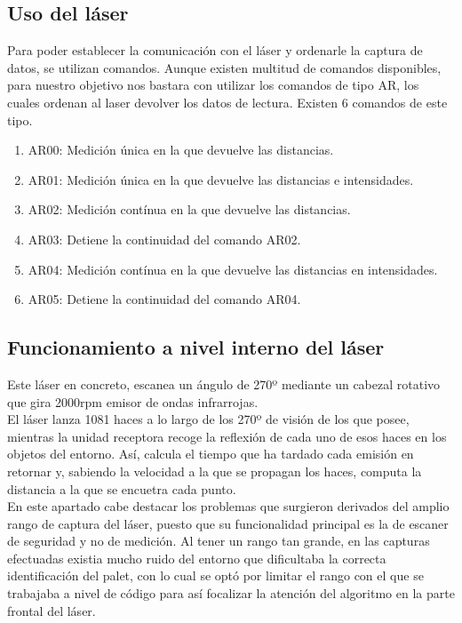 \subsection{Uso del láser}
Para poder establecer la comunicación con el láser y ordenarle la captura de datos, se utilizan comandos. Aunque existen multitud de comandos disponibles, para nuestro objetivo nos bastara con utilizar los comandos de tipo AR, los cuales ordenan al laser devolver los datos de lectura.
Existen 6 comandos de este tipo.
\begin{enumerate}
	\item AR00: Medición única en la que devuelve las distancias.
	\item AR01: Medición única en la que devuelve las distancias e intensidades.
	\item AR02: Medición contínua en la que devuelve las distancias.
	\item AR03: Detiene la continuidad del comando AR02.
	\item AR04: Medición contínua en la que devuelve las distancias en intensidades.
	\item AR05: Detiene la continuidad del comando AR04.
\end{enumerate}

\subsection{Funcionamiento a nivel interno del láser}
				Este láser en concreto, escanea un ángulo de 270º mediante un cabezal rotativo que gira 2000rpm emisor de ondas infrarrojas.\cite{hokuyo:data_specification} 
\\ El láser lanza 1081 haces  a lo largo de los 270º de visión de los que posee, mientras la unidad receptora recoge la reflexión de cada uno de esos haces en los objetos del entorno. Así, calcula el tiempo que ha tardado cada emisión en retornar y, sabiendo la velocidad a la que se propagan los haces, computa la distancia a la que se encuetra cada punto.\\
En este apartado cabe destacar los problemas que surgieron derivados del amplio rango de captura del láser, puesto que su funcionalidad principal es la de escaner de seguridad y no de medición. Al tener un rango tan grande, en las capturas efectuadas existia mucho ruido del entorno que dificultaba la correcta identificación del palet, con lo cual se optó por limitar el rango con el que se trabajaba a nivel de código para así focalizar la atención del algoritmo en la parte frontal del láser.\\
			


